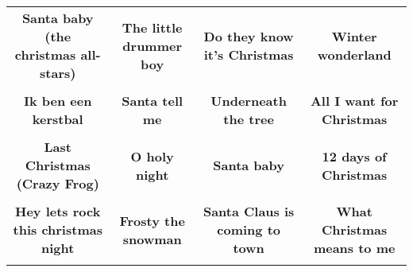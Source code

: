 \documentclass[12pt]{article} \usepackage{eso-pic, graphicx}
\newcommand{\background}[1]{%
\AddToShipoutPictureBG*{\texttt{[image: \#1]}}
}
\begin{document}
\tabcolsep=30.2pt \renewcommand{\arraystretch}{4.5}   \vspace*{4.3cm} \begin{center}  \begin{tabular}{c c c c}
\parbox{3cm}{\centering \textbf{Santa baby (the christmas all-stars)}}& 
\parbox{3cm}{\centering \textbf{The little drummer boy}}& 
\parbox{3cm}{\centering \textbf{Do they know it's Christmas}}& 
\parbox{3cm}{\centering \textbf{Winter wonderland}}\\ \\ 
\parbox{3cm}{\centering \textbf{Ik ben een kerstbal}}& 
\parbox{3cm}{\centering \textbf{Santa tell me}}& 
\parbox{3cm}{\centering \textbf{Underneath the tree}}& 
\parbox{3cm}{\centering \textbf{All I want for Christmas}}\\ \\ 
\parbox{3cm}{\centering \textbf{Last Christmas (Crazy Frog)}}& 
\parbox{3cm}{\centering \textbf{O holy night}}& 
\parbox{3cm}{\centering \textbf{Santa baby}}& 
\parbox{3cm}{\centering \textbf{12 days of Christmas}}\\ \\ 
\parbox{3cm}{\centering \textbf{Hey lets rock this christmas night}}& 
\parbox{3cm}{\centering \textbf{Frosty the snowman}}& 
\parbox{3cm}{\centering \textbf{Santa Claus is coming to town}}& 
\parbox{3cm}{\centering \textbf{What Christmas means to me}}\\ \\ 
\end{tabular} \background{discobingo.pdf} \end{center} 
\end{document}
